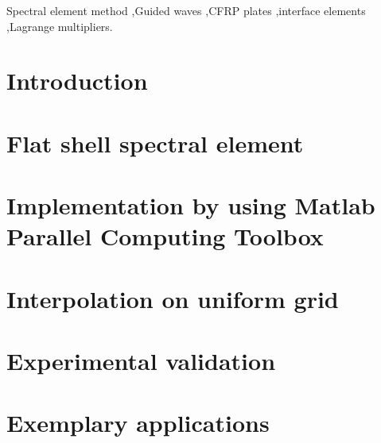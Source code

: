 \documentclass[preprint,12pt]{elsarticle}
\begin{document}
\begin{frontmatter}
		\begin{keyword}
			Spectral element method \sep Guided waves \sep CFRP plates \sep interface elements \sep Lagrange multipliers.
			
			
		\end{keyword}
		
	\end{frontmatter}
	
	
	\section{Introduction}
	\section{Flat shell spectral element}
	\section{Implementation by using Matlab Parallel Computing Toolbox}
	\section{Interpolation on uniform grid}
	\section{Experimental validation}
	\section{Exemplary applications}
\end{document}
